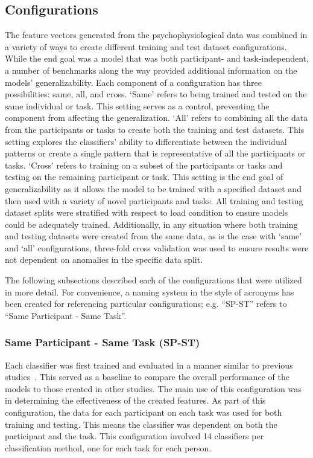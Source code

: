 \documentclass[11pt]{article}
\begin{document}
		
	\subsection{Configurations}
	The feature vectors generated from the psychophysiological data was combined in a variety of ways to create different training and test dataset configurations. While the end goal was a model that was both participant- and task-independent, a number of benchmarks along the way provided additional information on the models' generalizability. Each component of a configuration has three possibilities: same, all, and cross. `Same' refers to being trained and tested on the same individual or task. This setting serves as a control, preventing the component from affecting the generalization. `All' refers to combining all the data from the participants or tasks to create both the training and test datasets. This setting explores the classifiers' ability to differentiate between the individual patterns or create a single pattern that is representative of all the participants or tasks. `Cross' refers to training on a subset of the participants or tasks and testing on the remaining participant or task. This setting is the end goal of generalizability as it allows the model to be trained with a specified dataset and then used with a variety of novel participants and tasks. All training and testing dataset splits were stratified with respect to load condition to ensure models could be adequately trained. Additionally, in any situation where both training and testing datasets were created from the same data, as is the case with `same' and `all' configurations, three-fold cross validation was used to ensure results were not dependent on anomalies in the specific data split.
	
	The following subsections described each of the configurations that were utilized in more detail. For convenience, a naming system in the style of acronyms has been created for referencing particular configurations; e.g. ``SP-ST'' refers to ``Same Participant - Same Task''.
		
		\subsubsection{Same Participant - Same Task (SP-ST)}
		Each classifier was first trained and evaluated in a manner similar to previous studies~\cite{Wilson, Zhang, Wang_R, Yin}. This served as a baseline to compare the overall performance of the models to those created in other studies. The main use of this configuration was in determining the effectiveness of the created features. As part of this configuration, the data for each participant on each task was used for both training and testing. This means the classifier was dependent on both the participant and the task. This configuration involved 14 classifiers per classification method, one for each task for each person.
		 
\end{document}
